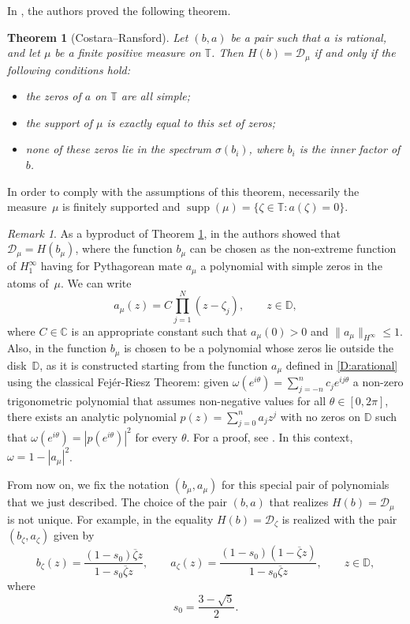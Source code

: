 \documentclass[12pt]{amsart}
\newtheorem{theorem}{Theorem}[section]
\theoremstyle{definition}
\theoremstyle{remark}
\theoremstyle{remark}
\newtheorem*{remark}{Remark}
\begin{document}
In \cite{costara2013}, the authors proved the following theorem.
\begin{theorem}[Costara--Ransford]\label{T:CostRans}
    Let $(b,a)$ be a pair such that $a$ is rational, and let $\mu$ be a finite positive measure on $\mathbb{T}$. Then $H(b)=\mathcal{D}_\mu$ if and only if the following conditions hold:
    \begin{itemize}
        \item the zeros of $a$ on $\mathbb{T}$ are all simple;
        \item the support of $\mu$ is exactly equal to this set of zeros;
        \item none of these zeros lie in the spectrum $\sigma(b_i)$, where $b_i$ is the inner factor of $b$.
    \end{itemize}
\end{theorem}
In order to comply with the assumptions of this theorem, necessarily the measure~$\mu$ is finitely supported and $\operatorname{supp}(\mu)=\{\zeta\in\mathbb{T}\colon a(\zeta)=0\}$. 
\begin{remark} As a byproduct of Theorem \ref{T:CostRans}, in \cite{costara2013} the authors showed that $\mathcal{D}_\mu = H(b_\mu)$, where the function $b_\mu$ can be chosen as the non-extreme function of $H^\infty_1$ having for Pythagorean mate $a_\mu$ a polynomial with simple zeros in the atoms of~$\mu$. We can write 
 \begin{equation} \label{D:arational}
     a_\mu(z) = C\prod_{j=1}^N(z-\zeta_j), \qquad z\in\mathbb{D},
 \end{equation}
 where $C\in\mathbb{C}$ is an appropriate constant such that $a_\mu(0)>0$ and $\|a_\mu\|_{H^\infty}\leq 1.$ Also, in \cite{costara2013} the function $b_\mu$ is chosen to be a polynomial whose zeros lie outside the  disk~$\mathbb{D}$, as it is constructed starting from the function $a_\mu$ defined in \eqref{D:arational} using the classical Fejér-Riesz Theorem: given $\omega(e^{i\theta})=\sum_{j=-n}^n c_j e^{ij\theta}$ a non-zero trigonometric polynomial that assumes non-negative values for all $\theta\in[0,2\pi]$, there exists an analytic polynomial $p(z)=\sum_{j=0}^n a_jz^j$ with no zeros on $\mathbb{D}$ such that $\omega(e^{i\theta})=|p(e^{i\theta})|^2$ for every $\theta$. For a proof, see \cite[Theorem 27.19]{hb2}. In this context, $\omega=1-|a_\mu|^2$.
\end{remark}

From now on, we fix the notation $(b_\mu,a_\mu)$ for this special pair of polynomials that we just described. The choice of the pair $(b,a)$ that realizes $H(b)=\mathcal{D}_\mu$ is not unique. For example, in \cite{Sarason1997LocalDS} the equality $H(b)=\mathcal{D}_\zeta$ is realized with the pair $(b_\zeta,a_\zeta)$ given by
 \[b_\zeta(z) = \frac{(1-s_0)\overline{\zeta} z}{1-s_0\overline{\zeta} z}, \qquad a_\zeta(z) = \frac{(1-s_0)(1-\overline{\zeta}z)}{1-s_0\overline{\zeta}z}, \qquad z\in\mathbb{D},\]
 where 
 \[s_0=\frac{3-\sqrt{5}}{2}.\]
 
\end{document}
